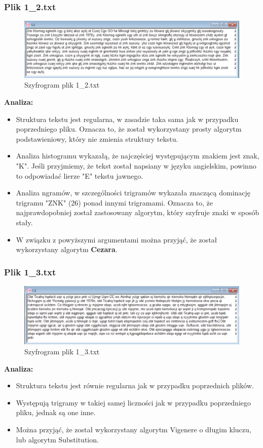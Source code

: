\documentclass{article}
\begin{document}
\subsubsection*{Plik 1\_2.txt}
\begin{figure}[H]
    \centering
    \includegraphics[width=\textwidth]{1_2.png}
    \caption{Szyfrogram plik 1\_2.txt}
\end{figure}
\textbf{Analiza:}
\begin{itemize}
    \item Struktura tekstu jest regularna, w zasadzie taka sama jak w przypadku poprzedniego pliku. Oznacza to, że został wykorzystany prosty algorytm podstawieniowy, który
    nie zmienia struktury tekstu.
    \item Analiza histogramu wykazałą, że najczęściej występującym znakiem jest znak, "K". Jeśli przyjmiemy, że tekst został napsiany w języku angielskim, powinno to odpowiadać lierze "E"
    tekstu jawnego.
    \item Analiza ngramów, w szczególności trigramów wykazała znaczącą dominację trigramu "ZNK" (26) ponad innymi trigramami. Oznacza to, że najprawdopobniej został zastosowany
    algorytm, który szyfruje znaki w sposób stały. 
    \item W związku z powyższymi argumentami można przyjąć, że został wykorzystany algorytm \textbf{Cezara}.
\end{itemize}
\subsubsection*{Plik 1\_3.txt}
\begin{figure}[H]
    \centering
    \includegraphics[width=\textwidth]{1_3.png}
    \caption{Szyfrogram plik 1\_3.txt}
\end{figure}
\textbf{Analiza:}
\begin{itemize}
    \item Struktura tekstu jest równie regularna jak w przypadku poprzednich plików. 
    \item Występują trigramy w takiej samej liczności jak w przypadku poprzedniego pliku, jednak są one inne.
    \item Można przyjąć, że został wykorzystany algorytm Vigenere o długim kluczu, lub algorytm Substitution.
\end{itemize}
\end{document}
